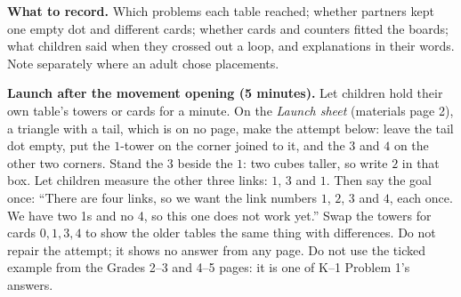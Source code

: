 \documentclass[11pt]{article}
\begin{document}
\textbf{What to record.} Which problems each table reached; whether partners kept one empty dot and different cards; whether cards and counters fitted the boards; what children said when they crossed out a loop, and explanations in their words. Note separately where an adult chose placements.

\begin{minipage}{\linewidth}
\setlength{\parskip}{6pt}
\textbf{Launch after the movement opening (5 minutes).} Let children hold their own table's towers or cards for a minute. On the \emph{Launch sheet} (materials page 2), a triangle with a tail, which is on no page, make the attempt below: leave the tail dot empty, put the $1$-tower on the corner joined to it, and the $3$ and $4$ on the other two corners. Stand the $3$ beside the $1$: two cubes taller, so write $2$ in that box. Let children measure the other three links: $1$, $3$ and $1$. Then say the goal once: ``There are four links, so we want the link numbers $1$, $2$, $3$ and $4$, each once. We have two 1s and no 4, so this one does not work yet.'' Swap the towers for cards $0,1,3,4$ to show the older tables the same thing with differences. Do not repair the attempt; it shows no answer from any page. Do not use the ticked example from the Grades 2--3 and 4--5 pages: it is one of K--1 Problem 1's answers.
\begin{center}
\end{center}
\end{minipage}
\end{document}
